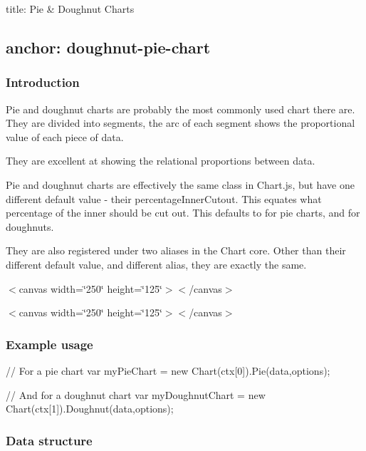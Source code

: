

 title\+: Pie \& Doughnut Charts \subsection*{anchor\+: doughnut-\/pie-\/chart }

\subsubsection*{Introduction}

Pie and doughnut charts are probably the most commonly used chart there are. They are divided into segments, the arc of each segment shows the proportional value of each piece of data.

They are excellent at showing the relational proportions between data.

Pie and doughnut charts are effectively the same class in Chart.\+js, but have one different default value -\/ their {\ttfamily percentage\+Inner\+Cutout}. This equates what percentage of the inner should be cut out. This defaults to {} for pie charts, and {} for doughnuts.

They are also registered under two aliases in the {\ttfamily Chart} core. Other than their different default value, and different alias, they are exactly the same.

 $<$canvas width=\char`\"{}250\char`\"{} height=\char`\"{}125\char`\"{}$>$$<$/canvas$>$ 

 $<$canvas width=\char`\"{}250\char`\"{} height=\char`\"{}125\char`\"{}$>$$<$/canvas$>$ 

\subsubsection*{Example usage}


\begin{DoxyCode}
// For a pie chart
var myPieChart = new Chart(ctx[0]).Pie(data,options);

// And for a doughnut chart
var myDoughnutChart = new Chart(ctx[1]).Doughnut(data,options);
\end{DoxyCode}


\subsubsection*{Data structure}




